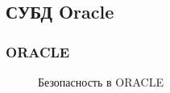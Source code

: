 \subsection{СУБД Oracle}


\begin{frame}
\frametitle{ORACLE}
\begin{figure}
    \begin{center}
        \caption{Безопасность в ORACLE}\label{pict:oracle}
    \end{center}
\end{figure} 
\end{frame}


